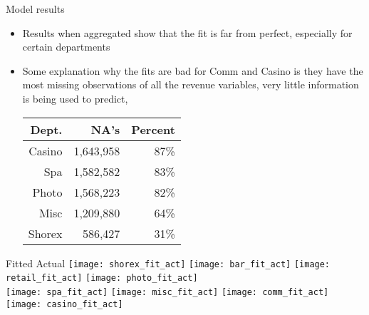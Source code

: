 \documentclass{beamer}
\begin{document}
\begin{frame}{Model results}
	\begin{itemize}
		\item Results when aggregated show that the fit is far from perfect, especially for certain departments 
		\item Some explanation why the fits are bad for Comm and Casino is they have the most missing observations of all the revenue variables, very little information is being used to predict, \\
		
		\centering
		\begin{tabular}{rrr}
			Dept. & NA's & Percent \\
			\hline 
			Casino & 1,643,958 & 87\% \\
			Spa & 1,582,582 & 83\% \\
			Photo & 1,568,223 & 82\% \\
			Misc   & 1,209,880 & 64\% \\
			Shorex    & 586,427 & 31\% \\
		\end{tabular}
	\end{itemize}
\end{frame}	

\begin{frame}{Fitted Actual}
		\centering
		\texttt{[image: shorex\_fit\_act]} \texttt{[image: bar\_fit\_act]} \texttt{[image: retail\_fit\_act]} \texttt{[image: photo\_fit\_act]} \\
		\texttt{[image: spa\_fit\_act]} \texttt{[image: misc\_fit\_act]} \texttt{[image: comm\_fit\_act]} \texttt{[image: casino\_fit\_act]}
\end{frame}
\end{document}
